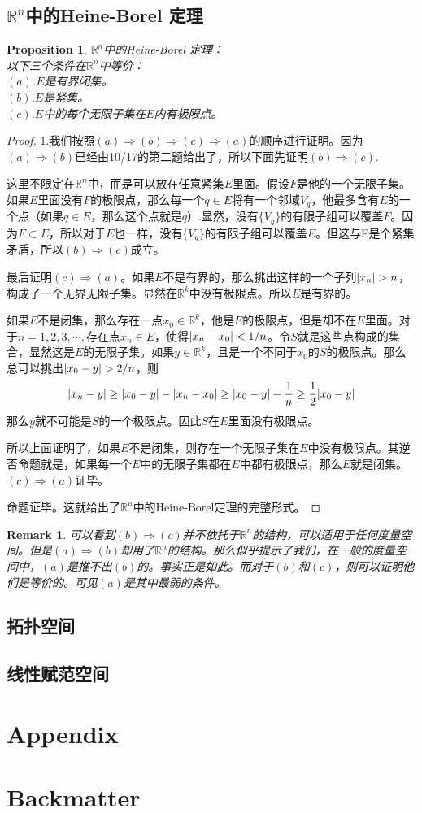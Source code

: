\documentclass[11pt,a4paper,openany]{book}%
\theoremstyle{plain}%
\newtheorem{pro}{Proposition}[chapter]%
\newtheorem*{rem}{Remark}%
\begin{document}
\section{$\mathbb{R}^{n}$中的Heine-Borel 定理}
\begin{pro}
$\mathbb{R}^{n}$中的Heine-Borel 定理：\\
以下三个条件在$\mathbb{R}^n$中等价：\\
$(a)$.$E$是有界闭集。\\
$(b)$.$E$是紧集。\\
$(c)$.$E$中的每个无限子集在$E$内有极限点。
\end{pro}
\begin{proof}
1.我们按照$(a)\Rightarrow (b)\Rightarrow (c)\Rightarrow (a)$的顺序进行证明。因为$(a)\Rightarrow (b)$已经由10/17的第二题给出了，所以下面先证明$(b)\Rightarrow (c)$.

这里不限定在$\mathbb{R}^n$中，而是可以放在任意紧集$E$里面。假设$F$是他的一个无限子集。如果$E$里面没有$F$的极限点，那么每一个$q\in E$将有一个邻域$V_q$，他最多含有$E$的一个点（如果$q\in E$，那么这个点就是$q$）.显然，没有$\{V_q\}$的有限子组可以覆盖$F$。因为$F\subset E$，所以对于$E$也一样，没有$\{V_q\}$的有限子组可以覆盖$E$。但这与E是个紧集矛盾，所以$(b)\Rightarrow (c)$成立。

最后证明$(c)\Rightarrow (a)$。如果$E$不是有界的，那么挑出这样的一个子列$\arrowvert x_n\arrowvert>n$，构成了一个无界无限子集。显然在$\mathbb{R}^k$中没有极限点。所以$E$是有界的。

如果$E$不是闭集，那么存在一点$x_0 \in \mathbb{R}^k$，他是$E$的极限点，但是却不在$E$里面。对于$n=1,2,3,\cdots,$存在点$x_n \in E$，使得$\arrowvert x_n-x_0\arrowvert <1/n$。令$S$就是这些点构成的集合，显然这是$E$的无限子集。如果$y \in \mathbb{R}^k$，且是一个不同于$x_0$的$S$的极限点。那么总可以挑出$\arrowvert x_0-y\arrowvert >2/n$，则
\[
\arrowvert x_n-y\arrowvert \geq \arrowvert x_0-y\arrowvert -\arrowvert x_n-x_0\arrowvert \geq \arrowvert x_0-y\arrowvert -\frac{1}{n}\geq \frac{1}{2}\arrowvert x_0-y\arrowvert 
\]
那么$y$就不可能是$S$的一个极限点。因此$S$在$E$里面没有极限点。

所以上面证明了，如果$E$不是闭集，则存在一个无限子集在$E$中没有极限点。其逆否命题就是，如果每一个$E$中的无限子集都在$E$中都有极限点，那么$E$就是闭集。$(c)\Rightarrow (a)$证毕。

命题证毕。这就给出了$\mathbb{R}^n$中的Heine-Borel定理的完整形式。
\end{proof}
\begin{rem}
可以看到$(b)\Rightarrow (c)$并不依托于$\mathbb{R}^n$的结构，可以适用于任何度量空间。但是$(a)\Rightarrow (b)$却用了$\mathbb{R}^n$的结构。那么似乎提示了我们，在一般的度量空间中，$(a)$是推不出$(b)$的。事实正是如此。而对于$(b)$和$(c)$，则可以证明他们是等价的。可见$(a)$是其中最弱的条件。
\end{rem}
\section{拓扑空间}
\section{线性赋范空间}
\appendix
\chapter*{Appendix}
\backmatter
\chapter*{Backmatter}
\end{document}
